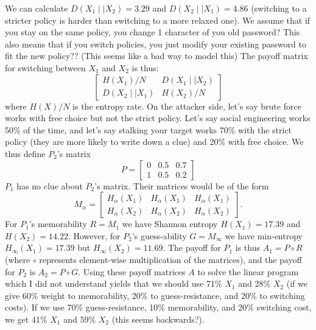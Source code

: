 \documentclass[12pt]{article}
\theoremstyle{remark}
\begin{document}
We can calculate $D(X_1 \mid \mid X_2) = 3.29$ and $D(X_2 \mid \mid X_1) = 4.86$ (switching to a stricter policy is harder than switching to a more relaxed one). We assume that if you stay on the same policy, you change 1 character of you old password? This also means that if you switch policies, you just modify your existing password to fit the new policy?? (This seems like a bad way to model this) The payoff matrix for switching between $X_1$ and $X_2$ is thus:
\[
\begin{bmatrix}
     H(X_1)/{N} & D(X_1 \mid \mid X_2) \\
    D(X_2 \mid \mid X_1) &H(X_2)/N
\end{bmatrix}
\]
where $H(X)/N$ is the entropy rate. On the attacker side, let's say brute force works with free choice but not the strict policy. Let's say social engineering works 50\% of the time, and let's say stalking your target works 70\% with the strict policy (they are more likely to write down a clue) and 20\% with free choice. We thus define $P_2$'s matrix
\[
P = \begin{bmatrix}
    0 & 0.5 & 0.7 \\
    1 & 0.5 & 0.2
\end{bmatrix}
\]
$P_1$ has no clue about $P_2$'s matrix. Their matrices would be of the form
\[
M_\alpha = \begin{bmatrix}
    H_\alpha(X_1) & H_\alpha(X_1) & H_\alpha(X_1) \\
    H_\alpha(X_2) & H_\alpha(X_2) & H_\alpha(X_2)
\end{bmatrix}.
\]
For $P_1$'s memorability $R=M_1$ we have Shannon entropy $H(X_1) = 17.39$ and $H(X_2) = 14.22$. However, for $P_2$'s guess-ability $G=M_\infty$ we have min-entropy $H_\infty(X_1) = 17.39$ but $H_\infty(X_2) = 11.69$. The payoff for $P_1$ is thus $A_1 = P \circ R$ (where $\circ$ represents element-wise multiplication of the matrices), and the payoff for $P_2$ is $A_2 = P \circ G$. Using these payoff matrices $A$ to solve the linear program which I did not understand yields that we should use 71\% $X_1$ and 28\% $X_2$ (if we give 60\% weight to memorability, 20\% to guess-resistance, and 20\% to switching costs). If we use 70\% guess-resistance, 10\% memorability, and 20\% switching cost, we get 41\% $X_1$ and 59\% $X_2$ (this seems backwards?). 
\end{document}
